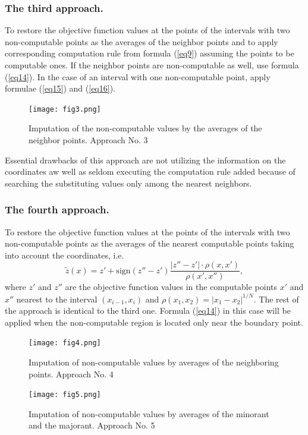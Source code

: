 \documentclass[runningheads]{llncs}
\begin{document}
\subsubsection{The third approach.} To restore the objective function values at the points of the intervals with two non-computable points as the averages of the neighbor points and to apply corresponding computation rule from formula (\ref{eq9}) assuming the points to be computable ones. If the neighbor points are non-computable as well, use formula (\ref{eq14}). In the case of an interval with one non-computable point, apply formulae (\ref{eq15}) and (\ref{eq16}).
\begin{figure}
\texttt{[image: fig3.png]}
\caption{Imputation of the non-computable values by the averages of the neighbor points. Approach No. 3} \label{fig3}
\end{figure}

Essential drawbacks of this approach are not utilizing the information on the coordinates aw well as seldom executing the computation rule added because of searching the substituting values only among the nearest neighbors.

\subsubsection{The fourth approach.} To restore the objective function values at the points of the intervals with two non-computable points as the averages of the nearest computable points taking into account the coordinates, i.e.
\begin{equation}\label{eq17} 
\tilde{z}(x)=z'+ \text{sign}(z''-z') \frac {|z''-z'| \cdot \rho(x,x')}{\rho(x',x'') },
\end{equation}
where $z'$ and $z''$ are the objective function values in the computable points $x'$ and $x''$  nearest to the interval $(x_{i-1},x_i)$ and $\rho(x_1,x_2) =  |x_1 - x_2|^{1/N}$.
The rest of the approach is identical to the third one. Formula (\ref{eq14}) in this case will be applied when the non-computable region is located only near the boundary point.
\begin{figure}
\texttt{[image: fig4.png]}
\caption{Imputation of non-computable values by averages of the neighboring points. Approach No. 4} \label{fig4}
\end{figure}
\begin{figure}
\texttt{[image: fig5.png]}
\caption{Imputation of non-computable values by averages of the minorant and the majorant. Approach No. 5} \label{fig5}
\end{figure}
\end{document}
